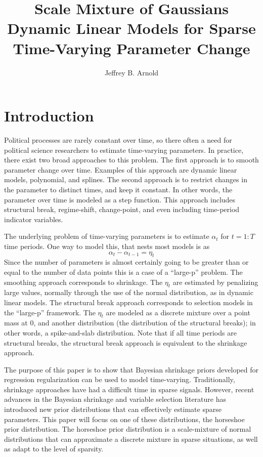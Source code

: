 \documentclass{article}
\author{Jeffrey B. Arnold}
\title{Scale Mixture of Gaussians Dynamic Linear Models for Sparse 
  Time-Varying Parameter Change}
\begin{document}
\maketitle{}

\begin{abstract}


\end{abstract}

\section{Introduction}
\label{sec:introduction}

Political processes are rarely constant over time, so there often a need for political science researchers to estimate time-varying parameters. 
In practice, there exist two broad approaches to this problem.
The first approach is to smooth parameter change over time.
Examples of this approach are dynamic linear models, polynomial, and splines.
The second approach is to restrict changes in the parameter to distinct times, and keep it constant. 
In other words, the parameter over time is modeled as a step function. 
This approach includes structural break, regime-shift, change-point, and even including time-period indicator variables.

The underlying problem of time-varying parameters is to estimate $\alpha_{t}$ for $t = 1:T$ time periods. 
One way to model this, that nests most models is as 
\begin{equation}
  \label{eq:7}
  \alpha_{t} - \alpha_{t-1}  = \eta_{t}
\end{equation}
Since the number of parameters is almost certainly going to be greater than or equal to the number of data points this is a case of a ``large-p'' problem.
The smoothing approach corresponds to shrinkage.
The $\eta_{t}$ are estimated by penalizing large values, normally through the use of the normal distribution, as in dynamic linear models.
The structural break approach corresponds to selection models in the ``large-p'' framework.
The $\eta_{t}$ are modeled as a discrete mixture over a point mass at 0, and another distribution (the distribution of the structural breaks); in other words, a spike-and-slab distribution.
Note that if all time periods are structural breaks, the structural break approach is equivalent to the shrinkage approach.

The purpose of this paper is to show that Bayesian shrinkage priors developed for regression regularization can be used to model time-varying.
Traditionally, shrinkage approaches have had a difficult time in sparse signals.
However, recent advances in the Bayesian shrinkage and variable selection literature has introduced new prior distributions that can effectively estimate sparse parameters. 
This paper will focus on one of these distributions, the horseshoe prior distribution.
The horseshoe prior distribution is a scale-mixture of normal distributions that can approximate a discrete mixture in sparse situations, as well as adapt to the level of sparsity.
\end{document}
